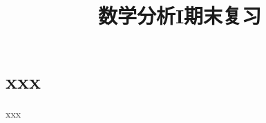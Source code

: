 \everymath{\displaystyle}



\title[数分I\\
期末复习]{\texorpdfstring{\Huge \bfseries 数学分析I期末复习}{数学分析I期末复习}} %
\date{}





\begin{frame}

\titlepage %

\end{frame}




\section{xxx}


\begin{frame}{xxx}



\end{frame}




